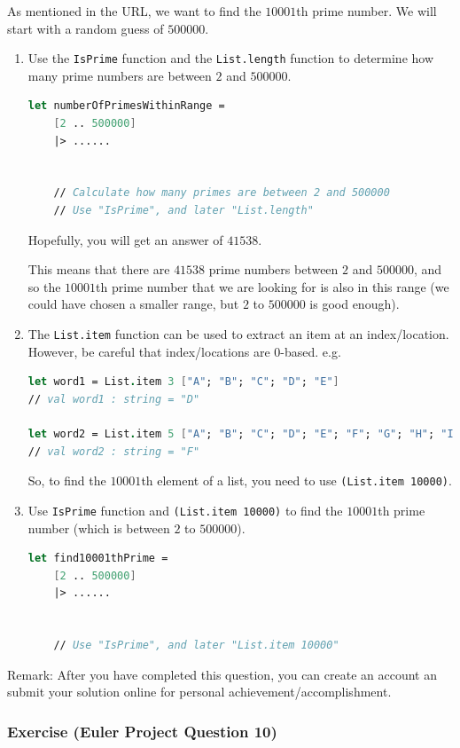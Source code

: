 \documentclass[12pt]{article}
\begin{document}
As mentioned in the URL, we want to find the $10001$th prime number. We will start with a random guess of $500000$.
\begin{enumerate}
\item Use the \texttt{IsPrime} function and the \texttt{List.length} function to determine how many prime numbers are between $2$ and $500000$.
\begin{lstlisting}[language=FSharp]
let numberOfPrimesWithinRange =
    [2 .. 500000]
    |> ......


    // Calculate how many primes are between 2 and 500000
    // Use "IsPrime", and later "List.length"
\end{lstlisting}
Hopefully, you will get an answer of $41538$. 

This means that there are $41538$ prime numbers between $2$ and $500000$, and so the $10001$th prime number that we are looking for is also in this range (we could have chosen a smaller range, but $2$ to $500000$ is good enough).

\item The \texttt{List.item} function can be used to extract an item at an index/location. However, be careful that index/locations are $0$-based. e.g.
\begin{lstlisting}[language=FSharp]
let word1 = List.item 3 ["A"; "B"; "C"; "D"; "E"]
// val word1 : string = "D"

let word2 = List.item 5 ["A"; "B"; "C"; "D"; "E"; "F"; "G"; "H"; "I"; "J"]
// val word2 : string = "F"
\end{lstlisting}
So, to find the $10001$th element of a list, you need to use \texttt{(List.item 10000)}.

\item Use \texttt{IsPrime} function and \texttt{(List.item 10000)} to find the $10001$th prime number (which is between $2$ to $500000$).
\begin{lstlisting}[language=FSharp]
let find10001thPrime =
    [2 .. 500000]
    |> ......


    // Use "IsPrime", and later "List.item 10000"
\end{lstlisting}

\end{enumerate}
Remark: After you have completed this question, you can create an account an submit your solution online for personal achievement/accomplishment.
\pagebreak

\subsubsection*{Exercise (Euler Project Question 10)}
\end{document}
